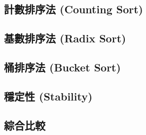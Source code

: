 \documentclass[12pt,a4paper,oneside]{report}
\begin{document}
\begin{CJK}{UTF8}{bkai}
\subsection{計數排序法 (Counting Sort)}
\subsection{基數排序法 (Radix Sort)}
\subsection{桶排序法 (Bucket Sort)}
\subsection{穩定性 (Stability)}
\subsection{綜合比較}

\ifx \allfiles \undefined

\printindex[noun]
\clearpage

\end{CJK}
\end{document}
